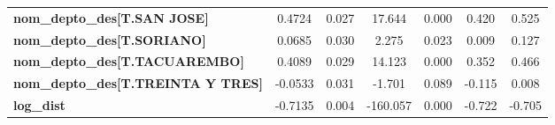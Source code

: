 \begin{center}
\begin{tabular}{lcccccc}
\textbf{nom\_depto\_des[T.SAN JOSE]}       &       0.4724  &        0.027     &    17.644  &         0.000        &        0.420    &        0.525     \\
\textbf{nom\_depto\_des[T.SORIANO]}        &       0.0685  &        0.030     &     2.275  &         0.023        &        0.009    &        0.127     \\
\textbf{nom\_depto\_des[T.TACUAREMBO]}     &       0.4089  &        0.029     &    14.123  &         0.000        &        0.352    &        0.466     \\
\textbf{nom\_depto\_des[T.TREINTA Y TRES]} &      -0.0533  &        0.031     &    -1.701  &         0.089        &       -0.115    &        0.008     \\
\textbf{log\_dist}                         &      -0.7135  &        0.004     &  -160.057  &         0.000        &       -0.722    &       -0.705     \\
\bottomrule
\end{tabular}
\end{center}